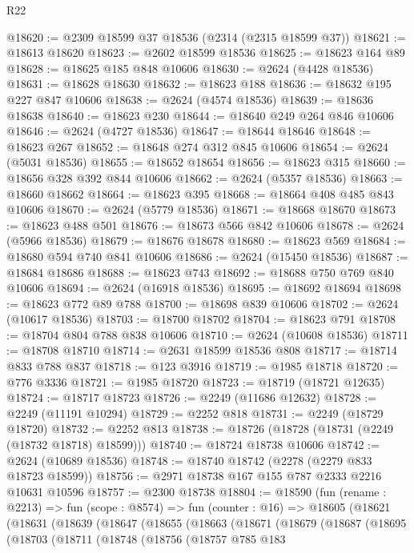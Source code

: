 \begin{lexlean}{R22}
\begin{coremodule}
@18620 := @2309 @18599 @37 @18536 (@2314 (@2315 @18599 @37))
@18621 := @18613 @18620
@18623 := @2602 @18599 @18536
@18625 := @18623 @164 @89
@18628 := @18625 @185 @848 @10606
@18630 := @2624 (@4428 @18536)
@18631 := @18628 @18630
@18632 := @18623 @188
@18636 := @18632 @195 @227 @847 @10606
@18638 := @2624 (@4574 @18536)
@18639 := @18636 @18638
@18640 := @18623 @230
@18644 := @18640 @249 @264 @846 @10606
@18646 := @2624 (@4727 @18536)
@18647 := @18644 @18646
@18648 := @18623 @267
@18652 := @18648 @274 @312 @845 @10606
@18654 := @2624 (@5031 @18536)
@18655 := @18652 @18654
@18656 := @18623 @315
@18660 := @18656 @328 @392 @844 @10606
@18662 := @2624 (@5357 @18536)
@18663 := @18660 @18662
@18664 := @18623 @395
@18668 := @18664 @408 @485 @843 @10606
@18670 := @2624 (@5779 @18536)
@18671 := @18668 @18670
@18673 := @18623 @488 @501
@18676 := @18673 @566 @842 @10606
@18678 := @2624 (@5966 @18536)
@18679 := @18676 @18678
@18680 := @18623 @569
@18684 := @18680 @594 @740 @841 @10606
@18686 := @2624 (@15450 @18536)
@18687 := @18684 @18686
@18688 := @18623 @743
@18692 := @18688 @750 @769 @840 @10606
@18694 := @2624 (@16918 @18536)
@18695 := @18692 @18694
@18698 := @18623 @772 @89 @788
@18700 := @18698 @839 @10606
@18702 := @2624 (@10617 @18536)
@18703 := @18700 @18702
@18704 := @18623 @791
@18708 := @18704 @804 @788 @838 @10606
@18710 := @2624 (@10608 @18536)
@18711 := @18708 @18710
@18714 := @2631 @18599 @18536 @808
@18717 := @18714 @833 @788 @837
@18718 := @123 @3916
@18719 := @1985 @18718
@18720 := @776 @3336
@18721 := @1985 @18720
@18723 := @18719 (@18721 @12635)
@18724 := @18717 @18723
@18726 := @2249 (@11686 @12632)
@18728 := @2249 (@11191 @10294)
@18729 := @2252 @818
@18731 := @2249 (@18729 @18720)
@18732 := @2252 @813
@18738 := @18726 (@18728 (@18731 (@2249 (@18732 @18718) @18599)))
@18740 := @18724 @18738 @10606
@18742 := @2624 (@10689 @18536)
@18748 := @18740 @18742 (@2278 (@2279 @833 @18723 @18599))
@18756 := @2971 @18738 @167 @155 @787 @2333 @2216 @10631 @10596
@18757 := @2300 @18738
@18804 := @18590
    (fun (rename : @2213) =>
    fun (scope : @8574) =>
    fun (counter : @16) =>
    @18605
      (@18621
        (@18631
          (@18639
            (@18647
              (@18655
                (@18663
                  (@18671
                    (@18679
                      (@18687
                        (@18695
                          (@18703
                            (@18711
                              (@18748
                                (@18756
                                  (@18757
                                    @785
                                    @183

\end{coremodule}
\end{lexlean}
